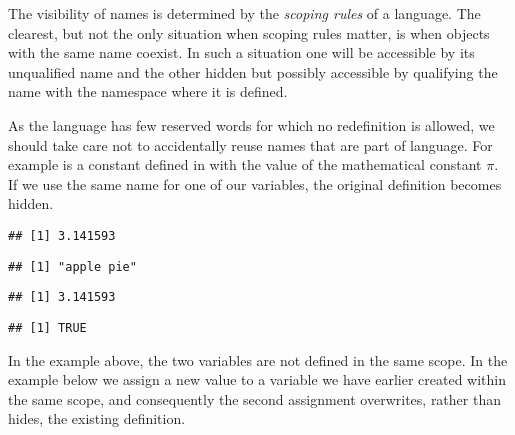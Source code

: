 \documentclass[krantz2]{krantz}\usepackage{knitr}
\begin{document}
The visibility of names is determined by the \emph{scoping rules} of a language. The clearest, but not the only situation when scoping rules matter, is when objects with the same name coexist. In such a situation one will be accessible by its unqualified name and the other hidden but possibly accessible by qualifying the name with the namespace where it is defined.

As the \Rlang language has few reserved words for which no redefinition is allowed, we should take care not to accidentally reuse names that are part of language. For example  is a constant defined in \Rlang with the value of the mathematical constant $\pi$. If we use the same name for one of our variables, the original definition becomes hidden.

\begin{knitrout}\footnotesize
{}\color{fgcolor}\begin{kframe}
\begin{alltt}
\end{alltt}
\begin{verbatim}
## [1] 3.141593
\end{verbatim}
\begin{alltt}
 \hlkwb{<-} 
\end{alltt}
\begin{verbatim}
## [1] "apple pie"
\end{verbatim}
\begin{alltt}
\end{alltt}
\begin{verbatim}
## [1] 3.141593
\end{verbatim}
\begin{alltt}
\hlstd{(}\hlstd{)}
\end{alltt}
\begin{verbatim}
## [1] TRUE
\end{verbatim}
\end{kframe}
\end{knitrout}

In the example above, the two variables are not defined in the same scope. In the example below we assign a new value to a variable we have earlier created within the same scope, and consequently the second assignment overwrites, rather than hides, the existing definition.
\end{document}
